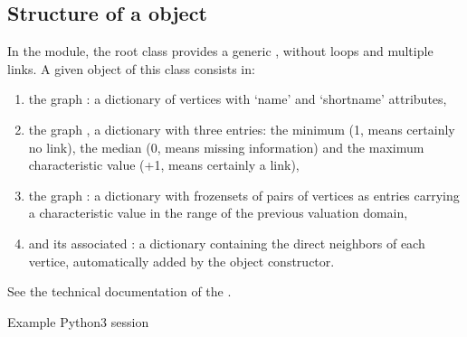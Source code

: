 \documentclass[a4paper,10pt,english]{sphinxhowto}
\begin{document}
\subsection{Structure of a  object}
\label{\detokenize{tutorial:structure-of-a-graph-object}}
In the  module, the root  class provides a generic , without loops and multiple links. A given object of this class consists in:
\begin{enumerate}
%
\item {} 
the graph  : a dictionary of vertices with ‘name’ and ‘shortname’ attributes,

\item {} 
the graph  , a dictionary with three entries: the minimum (\sphinxhyphen{}1, means certainly no link), the median (0, means missing information) and the maximum characteristic value (+1, means certainly a link),

\item {} 
the graph  : a dictionary with frozensets of pairs of vertices as entries carrying a characteristic value in the range of the previous valuation domain,

\item {} 
and its associated  : a dictionary containing the direct neighbors of each vertice, automatically added by the object constructor.

\end{enumerate}

See the technical documentation of the .

Example Python3 session

\begin{sphinxVerbatim}[commandchars=\\\{\},numbers=left,firstnumber=1,stepnumber=1]
   
  
\end{sphinxVerbatim}
\end{document}
